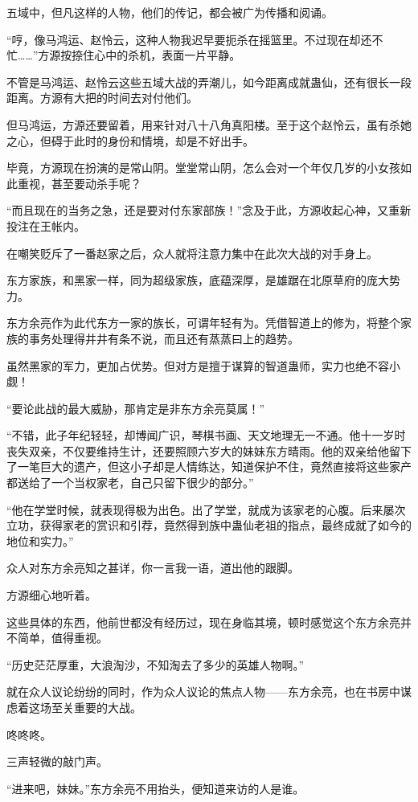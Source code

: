 \begin{this_body}
五域中，但凡这样的人物，他们的传记，都会被广为传播和阅诵。

“哼，像马鸿运、赵怜云，这种人物我迟早要扼杀在摇篮里。不过现在却还不忙……”方源按捺住心中的杀机，表面一片平静。

不管是马鸿运、赵怜云这些五域大战的弄潮儿，如今距离成就蛊仙，还有很长一段距离。方源有大把的时间去对付他们。

但马鸿运，方源还要留着，用来针对八十八角真阳楼。至于这个赵怜云，虽有杀她之心，但碍于此时的身份和情境，却是不好出手。

毕竟，方源现在扮演的是常山阴。堂堂常山阴，怎么会对一个年仅几岁的小女孩如此重视，甚至要动杀手呢？

“而且现在的当务之急，还是要对付东家部族！”念及于此，方源收起心神，又重新投注在王帐内。

在嘲笑贬斥了一番赵家之后，众人就将注意力集中在此次大战的对手身上。

东方家族，和黑家一样，同为超级家族，底蕴深厚，是雄踞在北原草府的庞大势力。

东方余亮作为此代东方一家的族长，可谓年轻有为。凭借智道上的修为，将整个家族的事务处理得井井有条不说，而且还有蒸蒸曰上的趋势。

虽然黑家的军力，更加占优势。但对方是擅于谋算的智道蛊师，实力也绝不容小觑！

“要论此战的最大威胁，那肯定是非东方余亮莫属！”

“不错，此子年纪轻轻，却博闻广识，琴棋书画、天文地理无一不通。他十一岁时丧失双亲，不仅要维持生计，还要照顾六岁大的妹妹东方晴雨。他的双亲给他留下了一笔巨大的遗产，但这小子却是人情练达，知道保护不住，竟然直接将这些家产都送给了一个当权家老，自己只留下很少的部分。”

“他在学堂时候，就表现得极为出色。出了学堂，就成为该家老的心腹。后来屡次立功，获得家老的赏识和引荐，竟然得到族中蛊仙老祖的指点，最终成就了如今的地位和实力。”

众人对东方余亮知之甚详，你一言我一语，道出他的跟脚。

方源细心地听着。

这些具体的东西，他前世都没有经历过，现在身临其境，顿时感觉这个东方余亮并不简单，值得重视。

“历史茫茫厚重，大浪淘沙，不知淘去了多少的英雄人物啊。”

就在众人议论纷纷的同时，作为众人议论的焦点人物——东方余亮，也在书房中谋虑着这场至关重要的大战。

咚咚咚。

三声轻微的敲门声。

“进来吧，妹妹。”东方余亮不用抬头，便知道来访的人是谁。


\end{this_body}
